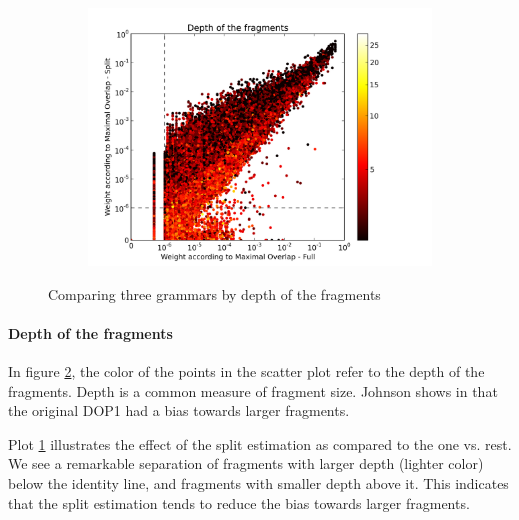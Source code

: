 \begin{figure}
\begin{subfigure}{0.32\textwidth}
\includegraphics[width=\linewidth,trim=0.5cm 0cm 2.5cm 0.5cm, clip=true]{../data/plots/2.png}
\caption{}
\label{f:MOS-MOF}
\end{subfigure}

\caption{Comparing three grammars by depth of the fragments}
\label{f:depth3}
\end{figure}

\paragraph{Depth of the fragments}
In figure \ref{f:depth3}, the color of the points in the scatter plot refer to the depth of the fragments. Depth is a common measure of fragment size. Johnson shows in  that the original DOP1 had a bias towards larger fragments. 

Plot \ref{f:MOS-MOF} illustrates the effect of the split estimation as compared to the one vs. rest. We see a remarkable separation of fragments with larger depth (lighter color) below the identity line, and fragments with smaller depth above it. This indicates that the split estimation tends to reduce the bias towards larger fragments.





























